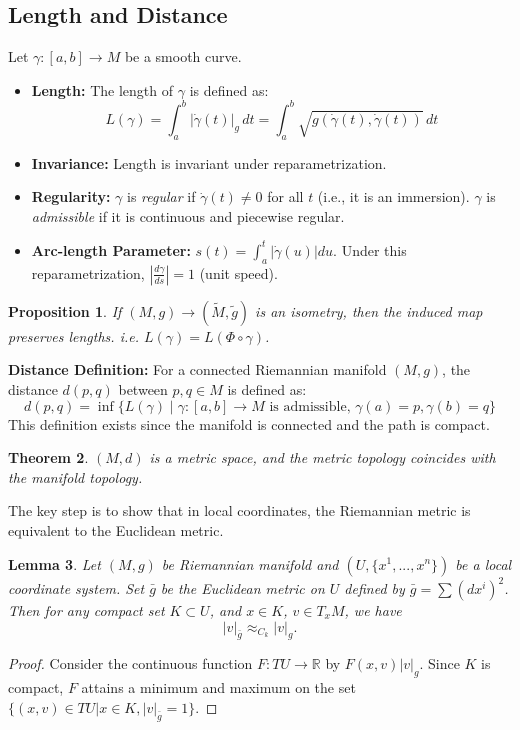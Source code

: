 \documentclass[11pt, a4paper]{article}
\theoremstyle{plain}
\newtheorem{theorem}{Theorem}[section]
\newtheorem{lemma}[theorem]{Lemma}
\newtheorem{proposition}[theorem]{Proposition}
\theoremstyle{definition}
\theoremstyle{remark}
\begin{document}
\subsection{Length and Distance}

Let $\gamma: [a, b] \to M$ be a smooth curve.
\begin{itemize}
    \item \textbf{Length:} The length of $\gamma$ is defined as:
    \[ L(\gamma) = \int_a^b |\dot{\gamma}(t)|_g \, dt = \int_a^b \sqrt{g(\dot{\gamma}(t), \dot{\gamma}(t))} \, dt \]
    \item \textbf{Invariance:} Length is invariant under reparametrization.
    \item \textbf{Regularity:} $\gamma$ is \textit{regular} if $\dot{\gamma}(t) \neq 0$ for all $t$ (i.e., it is an immersion). $\gamma$ is \textit{admissible} if it is continuous and piecewise regular.
    \item \textbf{Arc-length Parameter:} $s(t) = \int_a^t |\dot{\gamma}(u)| du$. Under this reparametrization, $|\frac{d\gamma}{ds}| = 1$ (unit speed).
\end{itemize}

\begin{proposition}
If $(M,g) \to (\tilde{M}, \tilde{g})$ is an isometry, then the induced map preserves lengths. i.e. $L(\gamma) = L(\Phi \circ \gamma)$.
\end{proposition}

\textbf{Distance Definition:} For a connected Riemannian manifold $(M, g)$, the distance $d(p, q)$ between $p, q \in M$ is defined as:
\[ d(p, q) = \inf \{ L(\gamma) \mid \gamma: [a, b] \to M \text{ is admissible, } \gamma(a)=p, \gamma(b)=q \} \]
This definition exists since the manifold is connected and the path is compact.

\begin{theorem}
     $(M, d)$ is a metric space, and the metric topology coincides with the manifold topology.
\end{theorem}
The key step is to show that in local coordinates, the Riemannian metric is equivalent to the Euclidean metric.
\begin{lemma}
    Let $(M,g)$ be Riemannian manifold and $(U,\{x^1,...,x^n\})$ be a local coordinate system. Set $\bar{g}$ be the Euclidean metric
    on $U$ defined by $\bar{g}=\sum (dx^i)^2$. Then for any compact set $K\subset U$, and $x\in K$, $v\in T_x M$, we have
    \[ |v|_{\bar{g}} \approx_{C_k} |v|_g. \]
\end{lemma}
\begin{proof}
    Consider the continuous function $F: TU \to \mathbb{R}$ by $F(x,v) |v|_g$. Since $K$ is compact, $F$ attains a minimum and maximum on the set $\{(x,v)\in TU| x\in K, |v|_{\bar{g}}=1\}$. 
\end{proof}
\end{document}
